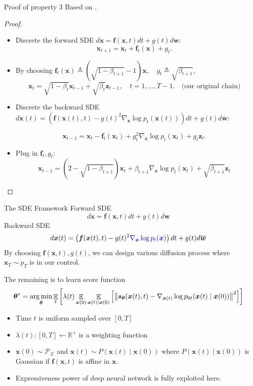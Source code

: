 \documentclass[10pt,xcolor={usenames,dvipsnames,table},aspectratio=169]{beamer}
\begin{document}
\begin{frame}{Proof of property 3}
    Based on .

\begin{proof}
\begin{itemize}
    \item Discrete the forward SDE $d \bm{x} = \bm{f}(\bm{x}, t) dt + g(t) d \bm{w} $:
\[
\bm{x}_{t+1} = \bm{x}_{t} + \bm{f}_{t}(\bm{x}) + g_t.
\] 
\item By choosing $ \bm{f}_t(\bm{x}) \triangleq \left(  \sqrt{1 - \beta_{t+1}}- 1\right) \bm{x}, \quad g_t \triangleq \sqrt{\beta_{t+1}}$, 
    \[
    \bm{x}_t = \sqrt{1- \beta_t} \bm{x}_{t-1} + \sqrt{\beta_t} \bm{z}_{t-1}, \quad t = 1, \ldots , T-1. \quad \text{(our original chain)}
    \] 
\item Discrete the backward SDE 
$ d \bm{x}(t) = \left( \bm{f}(\bm{x}(t), t) - g(t)^2 \nabla_{\bm{x}} \log p_{t}(\bm{x}(t))\right)dt  + g(t)d \overline{\bm{w}}$: 

\[
\bm{x}_{t-1} = \bm{x}_t - \bm{f}_t(\bm{x}_t) + g_t^2 \nabla_{\bm{x}} \log p_t(\bm{x}_t) + g_t\bm{z}_t.
\] 
\item Plug in $\bm{f}_t, g_t$:
\[
\bm{x}_{t-1} = (2 - \sqrt{1- \beta_{t+1}}) \bm{x}_{t} + \beta_{t+1} \nabla_{\bm{x}} \log p_t(\bm{x}_t) + \sqrt{\beta_{t+1}} \bm{z}_t
\] 
\end{itemize}
\end{proof}
\end{frame}

\begin{frame}{The SDE Framework}
Forward SDE
\[
d \bm{x} = \bm{f}(\bm{x}, t) dt + g(t) d \bm{w}
\] 
Backward SDE
\[
d \bm{x}(t) = \left( \bm{f}(\bm{x}(t), t) - g(t)^2 {\color{blue} \nabla_{\bm{x}} \log p_{t}(\bm{x})} \right)dt  + g(t)d \overline{\bm{w}}
\] 
By choosing $\bm{f}(\bm{x}, t) ,g(t)$, we can design various diffusion process where $\bm{x}_T \sim p_T$ is in our control.

The remaining is to learn score function
\[
\boldsymbol \theta^{*} = \operatorname*{arg\,min}_{\boldsymbol \theta} \mathop{\mathbb{E}}_{t} \left[ \lambda(t) \mathop{\mathbb{E}}_{\bm{x}(0)} \mathop{\mathbb{E}}_{\bm{x}(t) \mid \bm{x}(0)} \left[ \left\lVert\bm{s}_{\boldsymbol \theta}(\bm{x}(t), t) - \nabla_{\bm{x}(t)} \log p_{0t}(\bm{x}(t) \mid \bm{x}(0))\right\rVert^2 \right]  \right]
\] 
\begin{itemize}
    \item Time $t$ is uniform sampled over $[0, T]$
    \item $\lambda(t): [0, T] \leftarrow \mathbb{R}^{+}$ is a weighting function
    \item $\bm{x}(0) \sim \mathcal{P}_{\mathcal{X}}$ and $\bm{x}(t) \sim P(\bm{x}(t) \mid \bm{x}(0))$ where $P(\bm{x}(t) \mid \bm{x}(0))$ is Gaussian if $\bm{f}(\bm{x}, t)$ is affine in $\bm{x}$.
    \item Expressiveness power of deep neural network is fully exploited here.
\end{itemize}
\end{frame}
\end{document}
